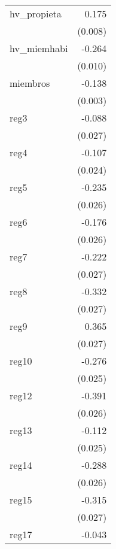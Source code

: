 {\begin{longtable}{l*{1}{D{.}{.}{-1}}}
\addlinespace
hv\_propieta &       0.175\sym{***}\\
            &     (0.008)         \\
\addlinespace
hv\_miemhabi &      -0.264\sym{***}\\
            &     (0.010)         \\
\addlinespace
miembros    &      -0.138\sym{***}\\
            &     (0.003)         \\
\addlinespace
reg3        &      -0.088\sym{***}\\
            &     (0.027)         \\
\addlinespace
reg4        &      -0.107\sym{***}\\
            &     (0.024)         \\
\addlinespace
reg5        &      -0.235\sym{***}\\
            &     (0.026)         \\
\addlinespace
reg6        &      -0.176\sym{***}\\
            &     (0.026)         \\
\addlinespace
reg7        &      -0.222\sym{***}\\
            &     (0.027)         \\
\addlinespace
reg8        &      -0.332\sym{***}\\
            &     (0.027)         \\
\addlinespace
reg9        &       0.365\sym{***}\\
            &     (0.027)         \\
\addlinespace
reg10       &      -0.276\sym{***}\\
            &     (0.025)         \\
\addlinespace
reg12       &      -0.391\sym{***}\\
            &     (0.026)         \\
\addlinespace
reg13       &      -0.112\sym{***}\\
            &     (0.025)         \\
\addlinespace
reg14       &      -0.288\sym{***}\\
            &     (0.026)         \\
\addlinespace
reg15       &      -0.315\sym{***}\\
            &     (0.027)         \\
\addlinespace
reg17       &      -0.043         \\

\end{longtable}}
